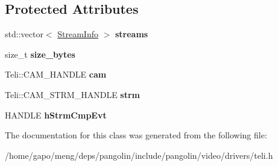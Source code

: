 \subsection*{Protected Attributes}
\begin{DoxyCompactItemize}
\item 
std\+::vector$<$ \hyperlink{classpangolin_1_1_stream_info}{Stream\+Info} $>$ {\bfseries streams}\hypertarget{classpangolin_1_1_teli_video_a46df18eef216bc5dee27599686b0c753}{}\label{classpangolin_1_1_teli_video_a46df18eef216bc5dee27599686b0c753}

\item 
size\+\_\+t {\bfseries size\+\_\+bytes}\hypertarget{classpangolin_1_1_teli_video_a354424e529443bb44f119ea5becffcfe}{}\label{classpangolin_1_1_teli_video_a354424e529443bb44f119ea5becffcfe}

\item 
Teli\+::\+C\+A\+M\+\_\+\+H\+A\+N\+D\+LE {\bfseries cam}\hypertarget{classpangolin_1_1_teli_video_ad8c5e06a14d24e9dc325e42d5db1de92}{}\label{classpangolin_1_1_teli_video_ad8c5e06a14d24e9dc325e42d5db1de92}

\item 
Teli\+::\+C\+A\+M\+\_\+\+S\+T\+R\+M\+\_\+\+H\+A\+N\+D\+LE {\bfseries strm}\hypertarget{classpangolin_1_1_teli_video_af063cb796a5c5f4eccf81047b46f10ee}{}\label{classpangolin_1_1_teli_video_af063cb796a5c5f4eccf81047b46f10ee}

\item 
H\+A\+N\+D\+LE {\bfseries h\+Strm\+Cmp\+Evt}\hypertarget{classpangolin_1_1_teli_video_ac08bae80c6f8a617d9d0c5717ccb07ba}{}\label{classpangolin_1_1_teli_video_ac08bae80c6f8a617d9d0c5717ccb07ba}

\end{DoxyCompactItemize}


The documentation for this class was generated from the following file\+:\begin{DoxyCompactItemize}
\item 
/home/gapo/meng/deps/pangolin/include/pangolin/video/drivers/teli.\+h\end{DoxyCompactItemize}
